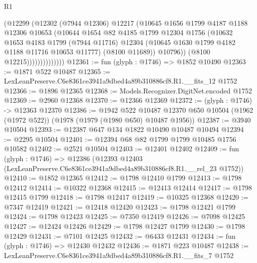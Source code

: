 \begin{lexlean}{R1}
\begin{coremodule}
                          (@12299
                            (@12302
                              (@7944 @12306)
                              @12217
                              (@10645
                                @1656
                                @1799
                                @4187
                                @1188
                                @12306
                                @10653
                                (@10644
                                  @1654
                                  @82
                                  @4185
                                  @1799
                                  @12304
                                  @1756
                                  (@10632
                                    @1653
                                    @4183
                                    @1799
                                    (@7944 @11716)
                                    @12304
                                    (@10645 @1630 @1799 @4182 @1188 @11716 @10653 @11777)
                                    (@8100 @11689))
                                  @10796))
                              (@8100 @12215))))))))))))))
@12361 := fun (glyph : @1746) => @1852 @10490
@12363 := @1871 @522 @10487
@12365 := LexLeanPreserve.C6e8361ce3941a9dbed4a89b310886cf8.R1.__fits_12 @1752
@12366 := @1896 @12365
@12368 := Models.Recognizer.DigitNet.encoded @1752
@12369 := @2960 @12368
@12370 := @12366 @12369
@12372 := (glyph : @1746) -> @12363 @12370
@12386 := @1942
    @522
    @10487
    @12370
    @650
    @10504
    (@1962 (@1972 @522))
    (@1978 (@1979 (@1980 @650) @10487 @1956))
@12387 := @3940 @10504
@12393 := @12387 @647 @134 @1822 @10490 @10487 @10494
@12394 := @2295 @10504
@12401 := @12394 @68 @82 @1799 @1799 @10485 @1756 @10582
@12402 := @2521 @10504
@12403 := @12401 @12402
@12409 := fun (glyph : @1746) =>
  @12386 (@12393 @12403 (LexLeanPreserve.C6e8361ce3941a9dbed4a89b310886cf8.R1.__rel_23 @1752))
@12410 := @1852 @12365
@12412 := @1798 @12410 @1799
@12413 := @1798 @12412
@12414 := @10322 @12368
@12415 := @12413 @12414
@12417 := @1798 @12415 @1799
@12418 := @1798 @12417
@12419 := @10325 @12368
@12420 := @7347 @12419
@12421 := @12418 @12420
@12423 := @1798 @12421 @1799
@12424 := @1798 @12423
@12425 := @7350 @12419
@12426 := @7098 @12425
@12427 := @12424 @12426
@12429 := @1798 @12427 @1799
@12430 := @1798 @12429
@12431 := @7101 @12425
@12432 := @6433 @12431
@12434 := fun (glyph : @1746) => @12430 @12432
@12436 := @1871 @223 @10487
@12438 := LexLeanPreserve.C6e8361ce3941a9dbed4a89b310886cf8.R1.__fits_7 @1752

\end{coremodule}
\end{lexlean}

